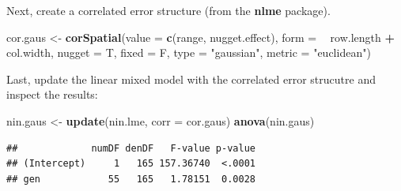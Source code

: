 \documentclass[]{book}
\newenvironment{Shaded}{\begin{snugshade}}{\end{snugshade}}
\newcommand{\DataTypeTok}[1]{\textcolor[rgb]{0.13,0.29,0.53}{#1}}
\newcommand{\DecValTok}[1]{\textcolor[rgb]{0.00,0.00,0.81}{#1}}
\newcommand{\KeywordTok}[1]{\textcolor[rgb]{0.13,0.29,0.53}{\textbf{#1}}}
\newcommand{\NormalTok}[1]{#1}
\newcommand{\OperatorTok}[1]{\textcolor[rgb]{0.81,0.36,0.00}{\textbf{#1}}}
\newcommand{\StringTok}[1]{\textcolor[rgb]{0.31,0.60,0.02}{#1}}
\begin{document}
\begin{Shaded}
\end{Shaded}

Next, create a correlated error structure (from the \textbf{nlme} package).

\begin{Shaded}
\begin{Highlighting}[]
\NormalTok{cor.gaus <-}\StringTok{ }\KeywordTok{corSpatial}\NormalTok{(}\DataTypeTok{value =} \KeywordTok{c}\NormalTok{(range, nugget.effect), }
                  \DataTypeTok{form =} \OperatorTok{~}\StringTok{ }\NormalTok{row.length }\OperatorTok{+}\StringTok{ }\NormalTok{col.width, }
                  \DataTypeTok{nugget =}\NormalTok{ T, }\DataTypeTok{fixed =}\NormalTok{ F,}
                  \DataTypeTok{type =} \StringTok{"gaussian"}\NormalTok{, }
                  \DataTypeTok{metric =} \StringTok{"euclidean"}\NormalTok{)}
\end{Highlighting}
\end{Shaded}

Last, update the linear mixed model with the correlated error strucutre and inspect the results:

\begin{Shaded}
\begin{Highlighting}[]
\NormalTok{nin.gaus <-}\StringTok{ }\KeywordTok{update}\NormalTok{(nin.lme, }\DataTypeTok{corr =}\NormalTok{ cor.gaus)}
\KeywordTok{anova}\NormalTok{(nin.gaus)}
\end{Highlighting}
\end{Shaded}

\begin{verbatim}
##             numDF denDF   F-value p-value
## (Intercept)     1   165 157.36740  <.0001
## gen            55   165   1.78151  0.0028
\end{verbatim}
\end{document}
